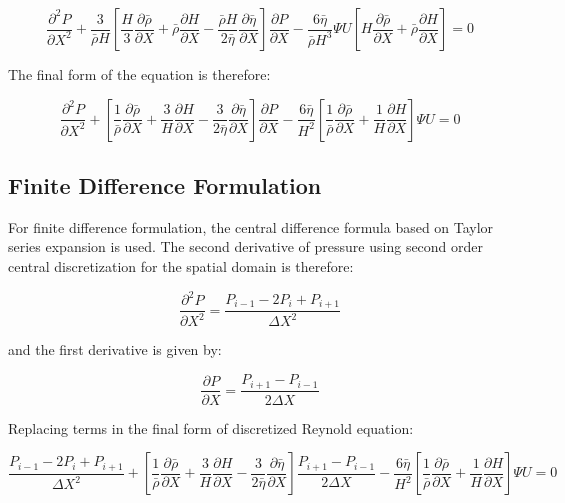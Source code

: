 \begin{equation}\label{eq3.13}
	\frac{\partial^{2} P}{\partial X^{2}}+\frac{3}{\bar{\rho} H}\left[\frac{H}{3} \frac{\partial \bar{\rho}}{\partial X}+\bar{\rho} \frac{\partial H}{\partial X}-\frac{\bar{\rho} H}{2 \bar{\eta}} \frac{\partial \bar{\eta}}{\partial X}\right] \frac{\partial P}{\partial X}-\frac{6 \bar{\eta}}{\bar{\rho} H^{3}} \Psi U\left[H \frac{\partial \bar{\rho}}{\partial X}+\bar{\rho} \frac{\partial H}{\partial X}\right]=0
\end{equation}

The final form of the equation is therefore:

\begin{equation}\label{eq3.14}
	\frac{\partial^{2} P}{\partial X^{2}}+\left[\frac{1}{\bar{\rho}} \frac{\partial \bar{\rho}}{\partial X}+\frac{3}{H} \frac{\partial H}{\partial X}-\frac{3}{2 \bar{\eta}} \frac{\partial \bar{\eta}}{\partial X}\right] \frac{\partial P}{\partial X}-\frac{6 \bar{\eta}}{H^{2}}\left[\frac{1}{\bar{\rho}} \frac{\partial \bar{\rho}}{\partial X}+\frac{1}{H} \frac{\partial H}{\partial X}\right] \Psi U=0
\end{equation}

\subsection{Finite Difference Formulation} \label{Finite Difference Formulation}

For finite difference formulation, the central difference formula based on Taylor series expansion \cite{Hoffmann2000} is used. The second derivative of pressure using second order central discretization for the spatial domain is therefore:

\begin{equation}\label{eq3.15}
	\frac{\partial^2 P}{\partial X^2}=\frac{P_{i-1}-2 P_i+P_{i+1}}{\Delta X^2}
\end{equation}

and the first derivative is given by:

\begin{equation}\label{eq3.16}
	\frac{\partial P}{\partial X}=\frac{P_{i+1}-P_{i-1}}{2 \Delta X}
\end{equation}

Replacing terms in the final form of discretized Reynold equation:

\begin{equation}\label{eq3.17}
	\frac{P_{i-1}-2 P_i+P_{i+1}}{\Delta X^2}+\left[\frac{1}{\bar{\rho}} \frac{\partial \bar{\rho}}{\partial X}+\frac{3}{H} \frac{\partial H}{\partial X}-\frac{3}{2 \bar{\eta}} \frac{\partial \bar{\eta}}{\partial X}\right] \frac{P_{i+1}-P_{i-1}}{2 \Delta X}-\frac{6 \bar{\eta}}{H^2}\left[\frac{1}{\bar{\rho}} \frac{\partial \bar{\rho}}{\partial X}+\frac{1}{H} \frac{\partial H}{\partial X}\right] \Psi U=0
\end{equation}

